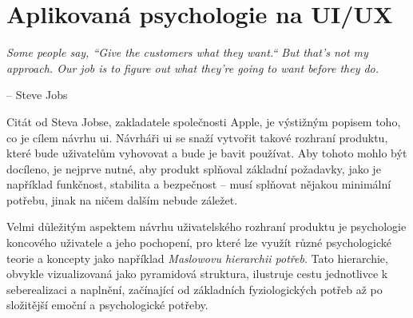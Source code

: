\section{Aplikovaná psychologie na UI/UX}
\label{sec:navrh-uzivatelskeho-rozhrani-psychologie}

\setlength{}
\epigraph{\textit{Some people say, ``Give the customers what they want.`` But that's not my approach. Our job is to figure out what they're going to want before they do.}}{-- Steve Jobs}

Citát od Steva Jobse, zakladatele společnosti Apple, je výstižným popisem toho, co je cílem návrhu \ac{ui}.
Návrháři \ac{ui} se snaží vytvořit takové rozhraní produktu, které bude uživatelům vyhovovat a bude je bavit používat.
Aby tohoto mohlo být docíleno, je nejprve nutné, aby produkt splňoval základní požadavky, jako je například funkčnost, stabilita a bezpečnost – musí splňovat nějakou minimální potřebu, jinak na ničem dalším nebude záležet\cite{bradley_hierarchy_of_needs}.

Velmi důležitým aspektem návrhu uživatelského rozhraní produktu je psychologie koncového uživatele a jeho pochopení, pro které lze využít různé psychologické teorie a koncepty jako například \textit{Maslowovu hierarchii potřeb}.
Tato hierarchie, obvykle vizualizovaná jako pyramidová struktura, ilustruje cestu jednotlivce k seberealizaci a naplnění, začínající od základních fyziologických potřeb až po složitější emoční a psychologické potřeby\cite{maslow_motivace_osobnost}.


